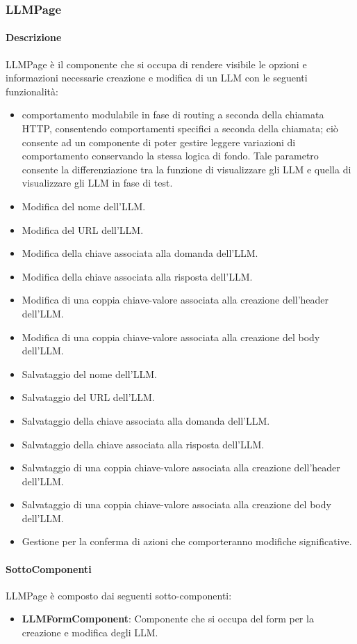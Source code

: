 \subsubsection{LLMPage} 
\label{sec:LLMPage}
\paragraph{Descrizione}
LLMPage è il componente che si occupa di rendere visibile le opzioni e informazioni necessarie creazione e modifica di un LLM  con le seguenti funzionalità:
\begin{itemize}
    \item comportamento modulabile in fase di routing a seconda della chiamata HTTP, consentendo comportamenti specifici a seconda della chiamata; ciò consente ad un componente di poter gestire leggere variazioni di comportamento conservando la stessa logica di fondo. Tale parametro consente la differenziazione tra la funzione di visualizzare gli LLM e quella di visualizzare gli LLM in fase di test.
    \item Modifica del nome dell'LLM.
    \item Modifica del URL dell'LLM.
    \item Modifica della chiave associata alla domanda dell'LLM.
    \item Modifica della chiave associata alla risposta dell'LLM.
    \item Modifica di una coppia chiave-valore associata alla creazione dell'header dell'LLM.
    \item Modifica di una coppia chiave-valore associata alla creazione del body dell'LLM.
    \item Salvataggio del nome dell'LLM.
    \item Salvataggio del URL dell'LLM.
    \item Salvataggio della chiave associata alla domanda dell'LLM.
    \item Salvataggio della chiave associata alla risposta dell'LLM.
    \item Salvataggio di una coppia chiave-valore associata alla creazione dell'header dell'LLM.
    \item Salvataggio di una coppia chiave-valore associata alla creazione del body dell'LLM.
    \item Gestione per la conferma di azioni che comporteranno modifiche significative.
\end{itemize}   
\paragraph{SottoComponenti}
LLMPage è composto dai seguenti sotto-componenti:
\begin{itemize}        
        \item \textbf{LLMFormComponent}: Componente che si occupa del form per la creazione e modifica degli LLM.
    \end{itemize}

